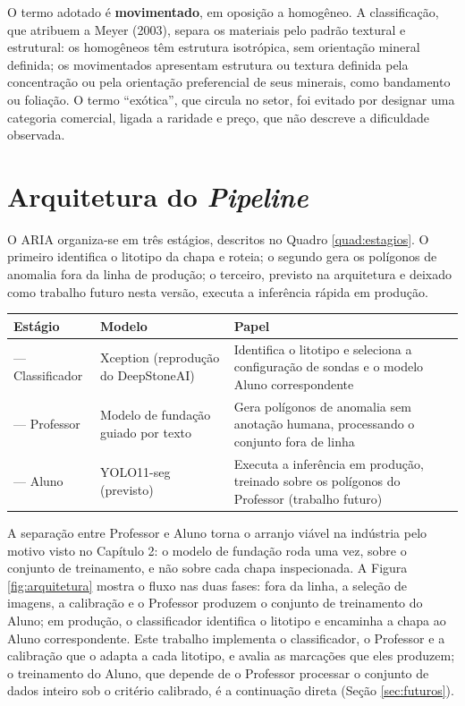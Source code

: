 O termo adotado é \textbf{movimentado}, em oposição a homogêneo. A classificação, que  atribuem a Meyer (2003), separa os materiais pelo padrão textural e estrutural: os homogêneos têm estrutura isotrópica, sem orientação mineral definida; os movimentados apresentam estrutura ou textura definida pela concentração ou pela orientação preferencial de seus minerais, como bandamento ou foliação. O termo ``exótica'', que circula no setor, foi evitado por designar uma categoria comercial, ligada a raridade e preço, que não descreve a dificuldade observada.

\section{Arquitetura do \textit{Pipeline}}

O ARIA organiza-se em três estágios, descritos no Quadro \ref{quad:estagios}. O primeiro identifica o litotipo da chapa e roteia; o segundo gera os polígonos de anomalia fora da linha de produção; o terceiro, previsto na arquitetura e deixado como trabalho futuro nesta versão, executa a inferência rápida em produção.

\begin{quadro}[ht]
  \caption{Estágios do \textit{pipeline} ARIA.}
  \label{quad:estagios}
  \centering
  \begin{tabularx}{\textwidth}{>{\raggedright\arraybackslash}p{3.0cm}>{\raggedright\arraybackslash}p{4.2cm}>{\raggedright\arraybackslash}X}
    \hline
    \bfseries Estágio & \bfseries Modelo & \bfseries Papel \\
    \hline
    1 --- Classificador & Xception (reprodução do DeepStoneAI) & Identifica o litotipo e seleciona a configuração de sondas e o modelo Aluno correspondente \\
    2 --- Professor & Modelo de fundação guiado por texto & Gera polígonos de anomalia sem anotação humana, processando o conjunto fora de linha \\
    3 --- Aluno & YOLO11-seg (previsto) & Executa a inferência em produção, treinado sobre os polígonos do Professor (trabalho futuro) \\
    \hline
  \end{tabularx}
\end{quadro}

A separação entre Professor e Aluno torna o arranjo viável na indústria pelo motivo visto no Capítulo 2: o modelo de fundação roda uma vez, sobre o conjunto de treinamento, e não sobre cada chapa inspecionada. A Figura \ref{fig:arquitetura} mostra o fluxo nas duas fases: fora da linha, a seleção de imagens, a calibração e o Professor produzem o conjunto de treinamento do Aluno; em produção, o classificador identifica o litotipo e encaminha a chapa ao Aluno correspondente. Este trabalho implementa o classificador, o Professor e a calibração que o adapta a cada litotipo, e avalia as marcações que eles produzem; o treinamento do Aluno, que depende de o Professor processar o conjunto de dados inteiro sob o critério calibrado, é a continuação direta (Seção \ref{sec:futuros}).

